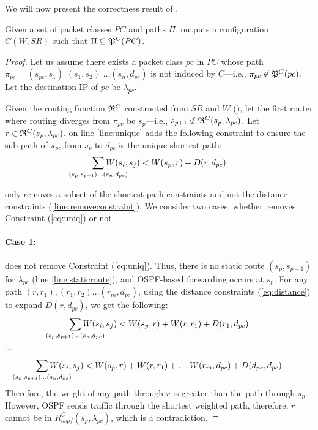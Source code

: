 
We will now present the correctness result of . 
\begin{theorem}[Correctness]
	Given a set of packet classes $PC$ and paths $\Pi$,  outputs
	a configuration $C(W,SR)$ such that $\Pi\subseteq\mathfrak{P}^C(PC)$.
\end{theorem}
\begin{proof}
Let us assume there exists a packet class $pc$ in $PC$ whose path $\pi_{pc} =
(s_{pc}, s_1)$ $ (s_1, s_2)$ 
$\ldots (s_n, d_{pc})$ is not induced by $C$---i.e.,
$\pi_{pc} \not\in \mathfrak{P}^C(pc)$. Let the destination IP of $pc$ be
$\lambda_{pc}$.

Given the routing function $\mathfrak{R}^C$ constructed from $SR$ and
$W$ (), let the first router where routing diverges from $\pi_{pc}$ be $s_p$---i.e.,  
$s_{p+1} \not\in \mathfrak{R}^C(s_{p}, \lambda_{pc})$. Let  $r \in \mathfrak{R}^C(s_{p}, \lambda_{pc})$.  
 on line \ref{line:unique} adds the following
constraint to ensure the sub-path of $\pi_{pc}$ 
from $s_{p}$ to $d_{pc}$ is the unique shortest path: 
\begin{equation} \label{eq:uniq}
\sum_{\mathclap{\substack{(s_{p},s_{p+1})\ldots(s_{n},d_{pc})}}} 
W(s_i, s_j) < W(s_{p}, r) + D(r, d_{pc})
\end{equation}

only removes a subset of the shortest path 
constraints and 
not the distance constraints (\ref{line:removeconstraint}). We consider 
two cases: whether 
removes Constraint (\ref{eq:uniq}) or not. 

\paragraph{Case 1:} 
 does not remove Constraint (\ref{eq:uniq}). 
Thus, there is no static route $(s_p, s_{p+1})$ for
$\lambda_{pc}$ (line \ref{line:staticroute}), and 
OSPF-based forwarding occurs at $s_{p}$. 
For any path $(r, r_1), (r_1, r_2) \ldots (r_m, d_{pc})$, 
using the distance constraints (\ref{eq:distance}) to
expand $D(r, d_{pc})$, we get the following: 
\[
\sum_{\mathclap{\substack{(s_{p},s_{p+1})\ldots(s_{n},d_{pc})}}} 
W(s_i, s_j) < W(s_{p}, r) + W(r, r_{1}) + D(r_{1}, d_{pc})
\]
\begin{center}
	$\ldots$
\end{center}
\[
\sum_{\mathclap{\substack{(s_{p},s_{p+1})\ldots(s_{n},d_{pc})}}} 
W(s_i, s_j) < W(s_{p}, r) + W(r, r_{1}) + \ldots W(r_{m}, d_{pc}) + D(d_{pc}, d_{pc})
\]
Therefore, the weight of any path through $r$ is greater than 
the path through $s_{p}$. However, 
OSPF sends traffic through the shortest weighted
path, therefore, $r$ cannot be in $R^C_{ospf}(s_p, \lambda_{pc})$,
which is a contradiction. 


\end{proof}

